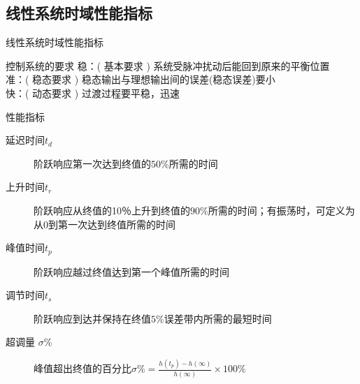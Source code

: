 \documentclass[handout,cjkutf8,table,aspectratio=1610]{beamer} %
\begin{document}
\subsection{线性系统时域性能指标}
\begin{frame}{线性系统时域性能指标}
\begin{block}{控制系统的要求}
稳：( \alert{基本要求} ) 系统受脉冲扰动后能回到原来的平衡位置\\
准：( \alert{稳态要求} ) 稳态输出与理想输出间的误差(稳态误差)要小\\
快：( \alert{动态要求} ) 过渡过程要平稳，迅速
\end{block}
\begin{block}{性能指标} 
\begin{description}
\item[延迟时间$t_d$]阶跃响应第一次达到终值的$50\%$所需的时间
\item[上升时间$ t_r$]阶跃响应从终值的10％上升到终值的$90\%$所需的时间；有振荡时，可定义为从0到第一次达到终值所需的时间
\item[峰值时间$t_p$] 阶跃响应越过终值达到第一个峰值所需的时间
\item[调节时间$t_s$] 阶跃响应到达并保持在终值$5\%$误差带内所需的最短时间
\item[超调量 $\sigma \%$] 峰值超出终值的百分比$\sigma\%=\frac{h(t_p)-h(\infty)}{h(\infty)}\times 100\%$
\end{description}
\end{block}
\end{frame}
\end{document}
